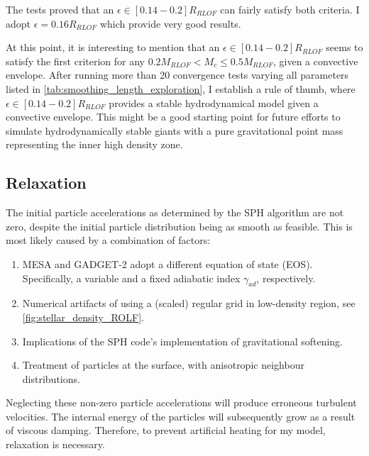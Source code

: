The tests proved that an $\epsilon \in [0.14-0.2] R_{RLOF}$ can fairly satisfy both criteria. I adopt $\epsilon = 0.16 R_{RLOF}$ which provide very good results.

At this point, it is interesting to mention that an $\epsilon \in [0.14-0.2] R_{RLOF}$ seems to satisfy the first criterion for any $0.2M_{RLOF} < M_c \leq 0.5M_{RLOF}$, given a convective envelope. After running more than 20 convergence tests varying all parameters listed in \cref{tab:smoothing_length_exploration}, I establish a rule of thumb, where $\epsilon \in [0.14-0.2] R_{RLOF}$ provides a stable hydrodynamical model given a convective envelope. This might be a good starting point for future efforts to simulate hydrodynamically stable giants with a pure gravitational point mass representing the inner high density zone.


\subsection{Relaxation}

The initial particle accelerations as determined by the SPH algorithm are not zero, despite the initial particle distribution being as smooth as feasible. This is most likely caused by a combination of factors:
\begin{enumerate}
    \item MESA and GADGET-2 adopt a different equation of state (EOS). Specifically, a variable and a fixed adiabatic index $\gamma_{ad}$, respectively.
    \item Numerical artifacts of using a (scaled) regular grid in low-density region, see \cref{fig:stellar_density_ROLF}.
    \item Implications of the SPH code's implementation of gravitational softening.
    \item Treatment of particles at the surface, with anisotropic neighbour distributions.
\end{enumerate}
Neglecting these non-zero particle accelerations will produce erroneous turbulent velocities. The internal energy of the particles will subsequently grow as a result of viscous damping. Therefore, to prevent artificial heating for my model, relaxation is necessary.

